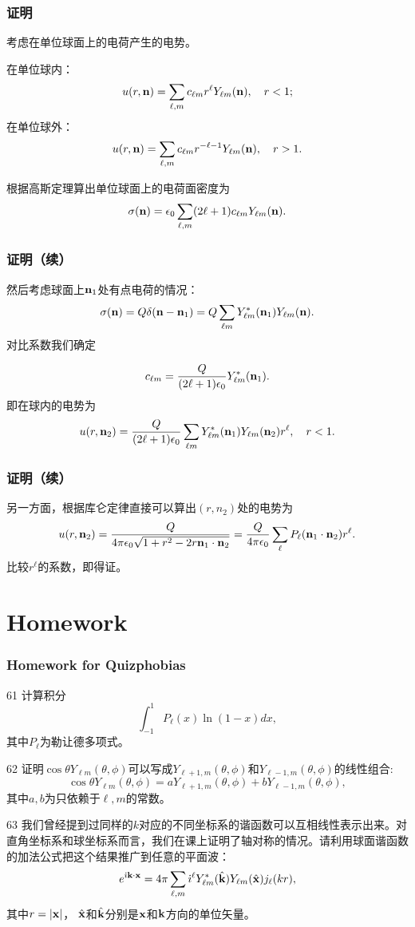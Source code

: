 \documentclass[CJK]{beamer}
\begin{document}
\begin{frame}
  \frametitle{证明}
  
  考虑在单位球面上的电荷产生的电势。

  在单位球内：
  $$ u(r, {\mathbf{n}}) = \sum_{\ell,m}c_{\ell m}r^\ell Y_{\ell m}({\mathbf{n}}),\ \ \ r<1 ;$$
  在单位球外：
  $$ u(r, {\mathbf{n}}) = \sum_{\ell,m}c_{\ell m}r^{-\ell-1} Y_{\ell m}({\mathbf{n}}),\ \ \ r>1 .$$
  
  根据高斯定理算出单位球面上的电荷面密度为
  $$\sigma({\mathbf{n}}) = \epsilon_0 \sum_{\ell,m}(2\ell+1)c_{\ell m}Y_{\ell m}({\mathbf{n}}).$$
  
\end{frame}


\begin{frame}
  \frametitle{证明（续）}
  
  然后考虑球面上${\mathbf{n}}_1$处有点电荷的情况：
  $$\sigma({\mathbf{n}}) = Q \delta({\mathbf{n}}-{\mathbf{n}}_1) = Q\sum_{\ell m}Y_{\ell m}^*({\mathbf{n}}_1)Y_{\ell m}({\mathbf{n}}).$$
  对比系数我们确定
  
  $$ c_{\ell m} = \frac{Q}{(2\ell+1)\epsilon_0}  Y_{\ell m}^*({\mathbf{n}}_1). $$
  即在球内的电势为
  $$ u(r,{\mathbf{n}}_2)= \frac{Q}{(2\ell+1)\epsilon_0} \sum_{\ell m} Y_{\ell m}^*({\mathbf{n}}_1)Y_{\ell m}({\mathbf{n}}_2)r^\ell,  \ \ \ r<1. $$
  
\end{frame}

\begin{frame}
  \frametitle{证明（续）}
  
  另一方面，根据库仑定律直接可以算出$(r, n_2)$处的电势为
  $$u(r,{\mathbf{n}}_2) = \frac{Q}{4\pi\epsilon_0\sqrt{1+r^2-2r{\mathbf{n}}_1\cdot{\mathbf{n}}_2}} = \frac{Q}{4\pi\epsilon_0}\sum_{\ell}P_\ell({\mathbf{n}}_1\cdot{\mathbf{n}}_2) r^\ell .$$
  比较$r^\ell$的系数，即得证。
  
\end{frame}


\section{Homework}

\begin{frame}
\frametitle{Homework for Quizphobias}

\bitem
\item[61]{计算积分
  $$\int_{-1}^1 P_\ell(x)\ln(1-x)dx, $$
其中$P_\ell$为勒让德多项式。
}
\item[62]{证明$\cos\theta Y_{\ell m}(\theta,\phi)$可以写成$Y_{\ell+1,m}(\theta,\phi)$和$Y_{\ell-1,m}(\theta,\phi)$的线性组合:
  $$ \cos\theta Y_{\ell m}(\theta,\phi) = a Y_{\ell+1,m}(\theta,\phi)+ b Y_{\ell-1,m}(\theta,\phi), $$
  其中$a, b$为只依赖于$\ell, m$的常数。
  }
\item[63]{我们曾经提到过同样的$k$对应的不同坐标系的谐函数可以互相线性表示出来。对直角坐标系和球坐标系而言，我们在课上证明了轴对称的情况。请利用球面谐函数的加法公式把这个结果推广到任意的平面波：
  $$ e^{{\dot{\imath}} {\mathbf{k}}\cdot{\mathbf{x}}} = 4\pi \sum_{\ell, m}{\dot{\imath}}^\ell Y_{\ell m}^*(\hat{{\mathbf{k}}})Y_{\ell m}(\hat{{\mathbf{x}}})j_{\ell}(kr),$$
其中$r=|{\mathbf{x}}|$， $\hat{{\mathbf{x}}}$和$\hat{{\mathbf{k}}}$分别是${\mathbf{x}}$和${\mathbf{k}}$方向的单位矢量。}
  \eitem

\end{frame}

\ech
\end{document}
